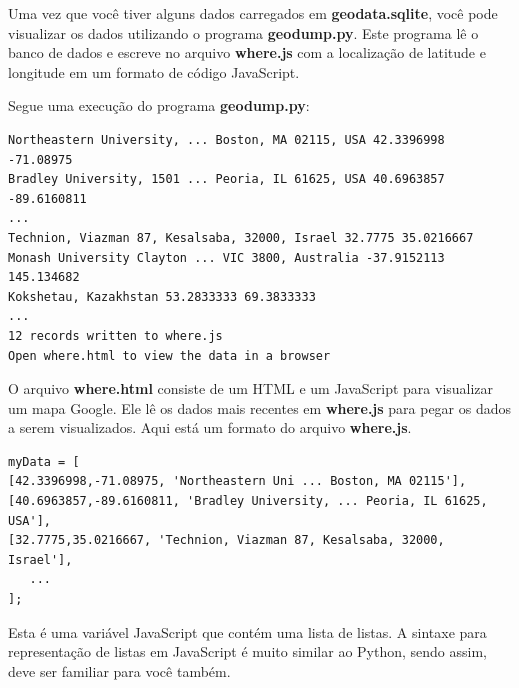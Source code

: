 Uma vez que você tiver alguns dados carregados em {\bf geodata.sqlite},
você pode visualizar os dados utilizando o programa {\bf geodump.py}.
Este programa lê o banco de dados e escreve no arquivo {\bf where.js}
com a localização de latitude e longitude em um formato de código 
JavaScript.

Segue uma execução do programa {\bf geodump.py}:

\beforeverb
\begin{verbatim}
Northeastern University, ... Boston, MA 02115, USA 42.3396998 -71.08975
Bradley University, 1501 ... Peoria, IL 61625, USA 40.6963857 -89.6160811
...
Technion, Viazman 87, Kesalsaba, 32000, Israel 32.7775 35.0216667
Monash University Clayton ... VIC 3800, Australia -37.9152113 145.134682
Kokshetau, Kazakhstan 53.2833333 69.3833333
...
12 records written to where.js
Open where.html to view the data in a browser
\end{verbatim}
\afterverb
%

O arquivo {\bf where.html} consiste de um HTML e um JavaScript para visualizar
um mapa Google. Ele lê os dados mais recentes em {\bf where.js} para pegar
os dados a serem visualizados. Aqui está um formato do arquivo {\bf where.js}.

\beforeverb
\begin{verbatim}
myData = [
[42.3396998,-71.08975, 'Northeastern Uni ... Boston, MA 02115'],
[40.6963857,-89.6160811, 'Bradley University, ... Peoria, IL 61625, USA'],
[32.7775,35.0216667, 'Technion, Viazman 87, Kesalsaba, 32000, Israel'],
   ...
];
\end{verbatim}
\afterverb
%

Esta é uma variável JavaScript que contém uma lista de listas.
A sintaxe para representação de listas em JavaScript é muito similar
ao Python, sendo assim, deve ser familiar para você também.

